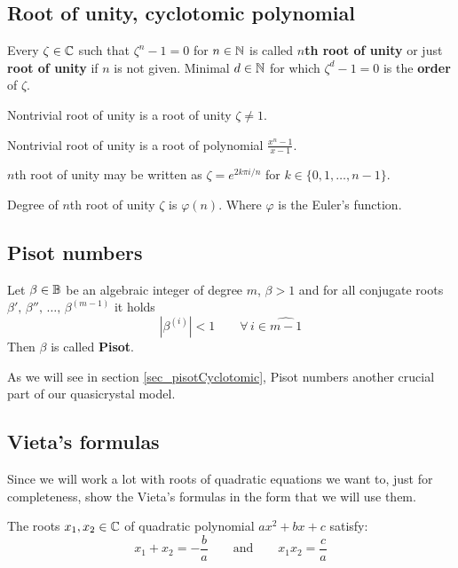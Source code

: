 \documentclass[text.tex]{subfiles}
\begin{document}
\subsection{Root of unity, cyclotomic polynomial}

\begin{definition}
Every $\zeta\in\mathbb{C}$ such that $\zeta^n-1=0$ for $n\in\mathbb{N}$ is called \textbf{$n$th root of unity} or just \textbf{root of unity} if $n$ is not given. Minimal $d\in\mathbb{N}$ for which $\zeta^d-1=0$ is the \textbf{order} of $\zeta$. 

Nontrivial root of unity is a root of unity $\zeta\neq 1$. 
\end{definition}

\begin{remark}
Nontrivial root of unity is a root of polynomial $\frac{x^n-1}{x-1}$.
\end{remark}

\begin{remark}
$n$th root of unity may be written as $\zeta = e^{2k\pi i/n}$ for $k\in \{0, 1, \dots, n-1\}$.
\end{remark}

\begin{theorem}
Degree of $n$th root of unity $\zeta$ is $\varphi(n)$. Where $\varphi$ is the Euler's function.
\end{theorem}

\subsection{Pisot numbers}
\begin{definition}
Let $\beta\in\mathbb{B}$ be an algebraic integer of degree $m$, $\beta>1$  and for all conjugate roots $\beta',\,\beta'',\,\dots ,\,\beta^{(m-1)}$ it holds
$$|\beta^{(i)}|<1\qquad \forall\, i\in\widehat{m-1}$$
Then $\beta$ is called \textbf{Pisot}.
\end{definition}

As we will see in section \ref{sec_pisotCyclotomic}, Pisot numbers another crucial part of our quasicrystal model. 

\subsection{Vieta's formulas}
Since we will work a lot with roots of quadratic equations we want to, just for completeness, show the Vieta's formulas in the form that we will use them. 

The roots $x_1,x_2\in\mathbb{C}$ of quadratic polynomial $ax^2+bx+c$ satisfy: 
$$x_1+x_2=-\frac{b}{a}\qquad\text{and}\qquad x_1x_2=\frac{c}{a}$$
\end{document}
